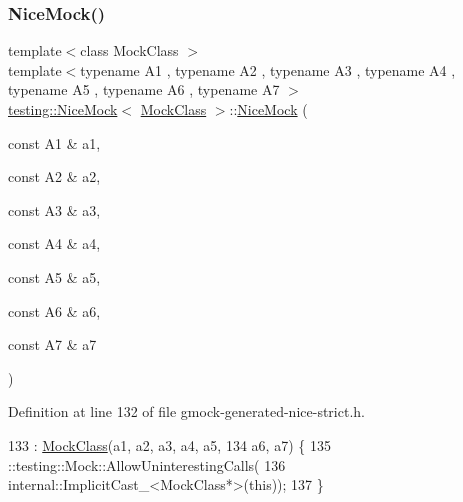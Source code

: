 \subsubsection{\texorpdfstring{Nice\+Mock()}{NiceMock()}\hspace{0.1cm}{\footnotesize\ttfamily [8/11]}}
{\footnotesize\ttfamily template$<$class Mock\+Class $>$ \\
template$<$typename A1 , typename A2 , typename A3 , typename A4 , typename A5 , typename A6 , typename A7 $>$ \\
\hyperlink{classtesting_1_1NiceMock}{testing\+::\+Nice\+Mock}$<$ \hyperlink{classMockClass}{Mock\+Class} $>$\+::\hyperlink{classtesting_1_1NiceMock}{Nice\+Mock} (\begin{DoxyParamCaption}\item[{const A1 \&}]{a1,  }\item[{const A2 \&}]{a2,  }\item[{const A3 \&}]{a3,  }\item[{const A4 \&}]{a4,  }\item[{const A5 \&}]{a5,  }\item[{const A6 \&}]{a6,  }\item[{const A7 \&}]{a7 }\end{DoxyParamCaption})\hspace{0.3cm}{\ttfamily [inline]}}



Definition at line 132 of file gmock-\/generated-\/nice-\/strict.\+h.


\begin{DoxyCode}
133                                                 : \hyperlink{classMockClass}{MockClass}(a1, a2, a3, a4, a5,
134       a6, a7) \{
135     ::testing::Mock::AllowUninterestingCalls(
136         internal::ImplicitCast\_<MockClass*>(\textcolor{keyword}{this}));
137   \}
\end{DoxyCode}
\mbox{\label{classtesting_1_1NiceMock_ae8792aab6c024a50886856bf1093eedc}} 
